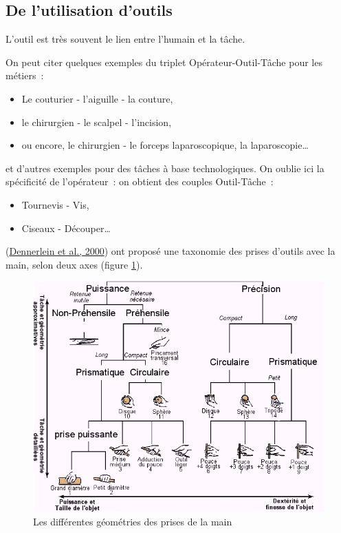 \documentclass[
]{book}
\providecommand{\tightlist}{%
  \setlength{\itemsep}{0pt}\setlength{\parskip}{0pt}}
\begin{document}
\hypertarget{de-lutilisation-doutils}{%
\subsection{De l'utilisation d'outils}\label{de-lutilisation-doutils}}

L'outil est très souvent le lien entre l'humain et la tâche.

On peut citer quelques exemples du triplet Opérateur-Outil-Tâche pour les
métiers~:

\begin{itemize}
\tightlist
\item
  Le couturier - l'aiguille - la couture,
\item
  le chirurgien - le scalpel - l'incision,
\item
  ou encore, le chirurgien - le forceps
  laparoscopique, la laparoscopie\ldots{}
\end{itemize}

et d'autres exemples pour des tâches à base technologiques. On oublie ici
la spécificité de l'opérateur~: on obtient des couples Outil-Tâche~:

\begin{itemize}
\tightlist
\item
  Tournevis - Vis,
\item
  Ciseaux - Découper\ldots{}
\end{itemize}

(\protect\hyperlink{ref-dennerlein2000force}{Dennerlein et al., 2000}) ont proposé
une taxonomie des prises d'outils avec la main, selon deux axes
(figure \ref{fig:differentesgeo}).

\begin{figure}
\centering
\includegraphics{img/manipulation.png}
\caption{\label{fig:differentesgeo}Les différentes géométries des prises de la
main}
\end{figure}
\end{document}
